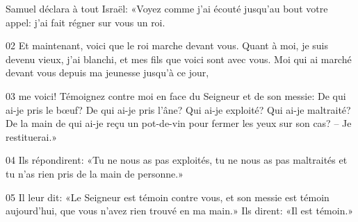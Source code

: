 Samuel déclara à tout Israël: «Voyez comme j’ai écouté jusqu’au bout votre appel: j’ai fait régner sur vous un roi.

02 Et maintenant, voici que le roi marche devant vous. Quant à moi, je suis devenu vieux, j’ai blanchi, et mes fils que voici sont avec vous. Moi qui ai marché devant vous depuis ma jeunesse jusqu’à ce jour,

03 me voici! Témoignez contre moi en face du Seigneur et de son messie: De qui ai-je pris le bœuf? De qui ai-je pris l’âne? Qui ai-je exploité? Qui ai-je maltraité? De la main de qui ai-je reçu un pot-de-vin pour fermer les yeux sur son cas? – Je restituerai.»

04 Ils répondirent: «Tu ne nous as pas exploités, tu ne nous as pas maltraités et tu n’as rien pris de la main de personne.»

05 Il leur dit: «Le Seigneur est témoin contre vous, et son messie est témoin aujourd’hui, que vous n’avez rien trouvé en ma main.» Ils dirent: «Il est témoin.»
